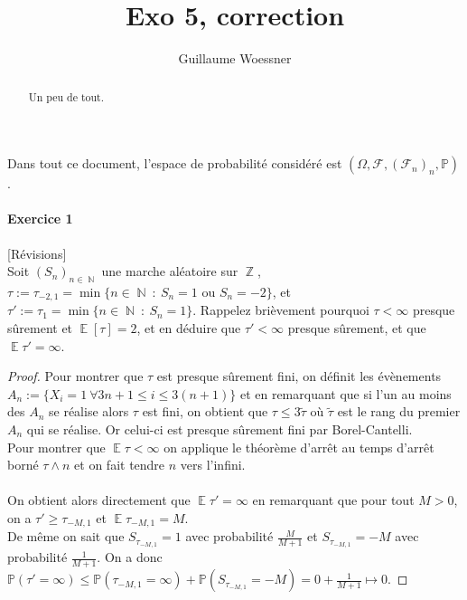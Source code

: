 \documentclass{article}
\title{Exo 5, correction}
\author{Guillaume Woessner}
\date{}                       %
\theoremstyle{definition}
\numberwithin{equation}{section}
\DeclareMathOperator{\Z}{\mathbb{Z}}
\DeclareMathOperator{\N}{\mathbb{N}}
\DeclareMathOperator{\E}{\mathbb{E}}
\begin{document}
\maketitle                    %

\begin{abstract}
\begin{center}
Un peu de tout.
\end{center}
\end{abstract}



Dans tout ce document, l'espace de probabilité considéré est $(\Omega,\mathcal{F},(\mathcal{F}_n)_n,\mathbb{P})$.



\paragraph{Exercice 1} [Révisions]~\\
Soit $(S_n)_{n\in \N}$ une marche aléatoire sur $\Z$, $\tau:=\tau_{-2,1}=\min\{n\in\N~:~S_n=1 \text{ ou } S_n=-2\}$, et $\tau':=\tau_1 = \min\{n\in\N~:~S_n=1\}$. Rappelez brièvement pourquoi $\tau<\infty$ presque sûrement et $\E[\tau]=2$, et en déduire que $\tau'<\infty$ presque sûrement, et que $\E\tau'=\infty$.

\begin{proof}
Pour montrer que $\tau$ est presque sûrement fini, on définit les évènements $A_n:=\{X_i=1~\forall 3n+1 \leq i \leq 3(n+1)\}$ et en remarquant que si l'un au moins des $A_n$ se réalise alors $\tau$ est fini, on obtient que $\tau \leq 3\tilde{\tau}$ où $\tilde{\tau}$ est le rang du premier $A_n$ qui se réalise. Or celui-ci est presque sûrement fini par Borel-Cantelli.\\
Pour montrer que $\E\tau<\infty$ on applique le théorème d'arrêt au temps d'arrêt borné $\tau\wedge n$ et on fait tendre $n$ vers l'infini.\\
~\\
On obtient alors directement que $\E\tau'=\infty$ en remarquant que pour tout $M>0$, on a $\tau'\geq \tau_{-M,1}$ et $\E\tau_{-M,1}=M$.\\
De même on sait que $S_{\tau_{-M,1}}=1$ avec probabilité $\frac{M}{M+1}$ et $S_{\tau_{-M,1}}=-M$ avec probabilité $\frac{1}{M+1}$. On a donc $\mathbb{P}(\tau'=\infty)\leq \mathbb{P}(\tau_{-M,1}=\infty)+\mathbb{P}(S_{\tau_{-M,1}}=-M) = 0 + \frac{1}{M+1}\mapsto 0$.
\end{proof}
\end{document}
